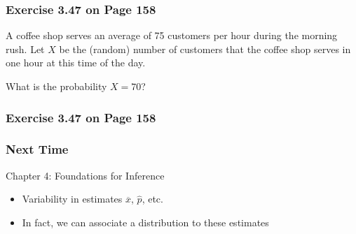 \documentclass[handout]{beamer}
\newcommand{\blue}[1]{\textcolor{blue2}{#1}}
\begin{document}
\begin{frame}
\frametitle{Exercise 3.47 on Page 158}

A coffee shop serves an average of 75 customers per hour during the morning rush.  Let $X$ be the (random) number of customers that the coffee shop serves in one hour at this time of the day.  

\vspace{0.5cm}

What is the probability $X=70$?

\end{frame}


\begin{frame}
\frametitle{Exercise 3.47 on Page 158}
%
%
%
%

\end{frame}


\begin{frame}[fragile]
\frametitle{Next Time}

Chapter 4:  Foundations for Inference
\begin{itemize}
\item Variability in estimates $\overline{x}$, $\widehat{p}$, etc.
\item In fact, we can associate a \blue{distribution} to these estimates
\end{itemize}


\end{frame}
\end{document}
